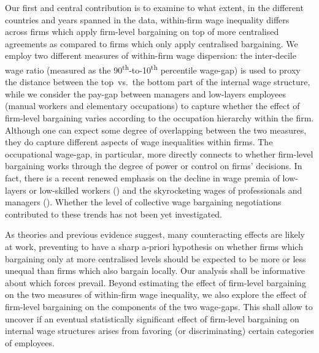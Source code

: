 \documentclass[12pt]{article}
\begin{document}
Our first and central contribution is to examine to what extent, in
the different countries and years spanned in the data, within-firm
wage inequality differs across firms which apply firm-level bargaining
on top of more centralised agreements as compared to firms which only
apply centralised bargaining. We employ two different measures of
within-firm wage dispersion: the inter-decile wage ratio (measured as
the 90\textsuperscript{th}-to-10\textsuperscript{th} percentile
wage-gap) is used to proxy the distance between the top~vs.~the bottom
part of the internal wage structure, while we consider the pay-gap
between managers and low-layers employees (manual workers and
elementary occupations) to capture whether the effect of firm-level
bargaining varies according to the occupation hierarchy within the
firm. Although one can expect some degree of overlapping between the
two measures, they do capture different aspects of wage inequalities
within firms. The occupational wage-gap, in particular, more directly
connects to whether firm-level bargaining works through the degree of
power or control on firms' decisions. In fact, there is a recent
renewed emphasis on the decline in wage premia of low-layers or
low-skilled workers (\citealt{song_etal2015NBER}) and the skyrocketing
wages of professionals and managers (\citealt{piketty,
  sabadish_mishel}). Whether the level of collective wage bargaining
negotiations contributed to these trends has not been yet investigated.

As theories and previous evidence suggest, many counteracting effects
are likely at work, preventing to have a sharp a-priori hypothesis on
whether firms which bargaining only at more centralised levels should
be expected to be more or less unequal than firms which also bargain
locally. Our analysis shall be informative about which forces prevail.
Beyond estimating the effect of firm-level bargaining on the two
measures of within-firm wage inequality, we also explore the effect of
firm-level bargaining on the components of the two wage-gaps. This
shall allow to uncover if an eventual statistically significant effect
of firm-level bargaining on internal wage structures arises from
favoring (or discriminating) certain categories of employees.
\end{document}
